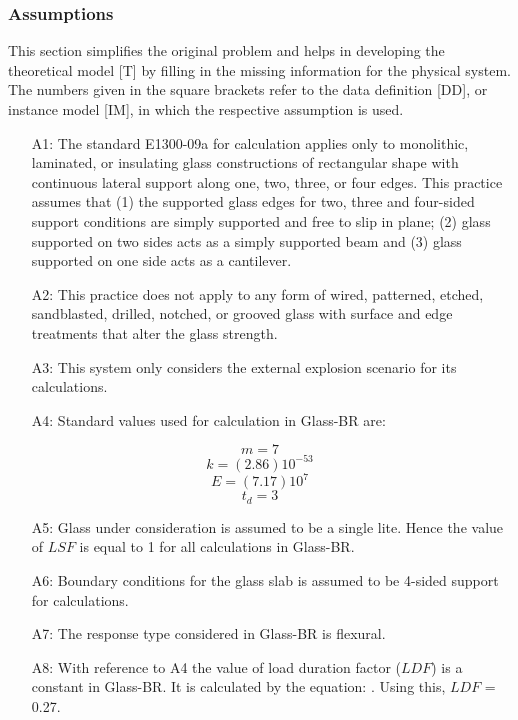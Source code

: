 \documentclass[12pt]{article}
\begin{document}
\subsubsection{Assumptions}
\label{Sec:As}
This section simplifies the original problem and helps in developing the theoretical model [T] by filling in the missing information for the physical system. The numbers given in the square brackets refer to the data definition [DD], or instance model [IM], in which the respective assumption is used.
\begin{itemize}
\item[A1:]The standard E1300-09a for calculation applies only to monolithic, laminated, or insulating glass constructions of rectangular shape with continuous lateral support along one, two, three, or four edges. This practice assumes that (1) the supported glass edges for two, three and four-sided support conditions are simply supported and free to slip in plane; (2) glass supported on two sides acts as a simply supported beam and (3) glass supported on one side acts as a cantilever.
\item[A2:]This practice does not apply to any form of wired, patterned, etched, sandblasted, drilled, notched, or grooved glass with surface and edge treatments that alter the glass strength.
\item[A3:]This system only considers the external explosion scenario for its calculations.
\item[A4:]Standard values used for calculation in Glass-BR are:
\end{itemize}
\begin{equation}
m=7
\end{equation}
\begin{equation}
k=(2.86)10^{-53}
\end{equation}
\begin{equation}
E=(7.17)10^{7}
\end{equation}
\begin{equation}
t_{d}=3
\end{equation}
\begin{itemize}
\item[A5:]Glass under consideration is assumed to be a single lite. Hence the value of $LSF$ is equal to 1 for all calculations in Glass-BR.
\item[A6:]Boundary conditions for the glass slab is assumed to be 4-sided support for calculations.
\item[A7:]The response type considered in Glass-BR is flexural.
\item[A8:]With reference to A4 the value of load duration factor ($LDF$) is a constant in Glass-BR. It is calculated by the equation: . Using this, $LDF$ = 0.27.
\end{itemize}
\end{document}
